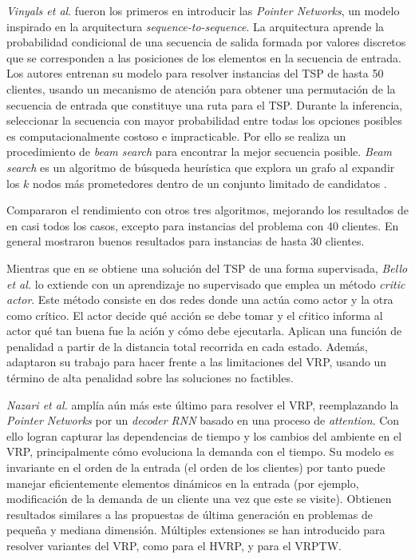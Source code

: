 \textit{Vinyals et al}. \cite{PointerNVinyals} fueron los primeros en introducir las \textit{Pointer Networks}, un modelo inspirado en la arquitectura \textit{sequence-to-sequence}. 
 La arquitectura aprende la probabilidad condicional de una secuencia de salida formada por valores discretos que se corresponden a las posiciones de los elementos en la secuencia de entrada. Los autores entrenan su modelo para resolver instancias del TSP de hasta 50 clientes, usando un mecanismo de atención para obtener una permutación de la secuencia de entrada que constituye una ruta para el TSP. Durante la inferencia, seleccionar la secuencia con mayor probabilidad entre todas los opciones posibles es computacionalmente costoso e impracticable. Por ello se realiza un procedimiento de \textit{beam search} para encontrar la mejor secuencia posible. \textit{Beam search } es un algoritmo de búsqueda heurística que explora un grafo al expandir los $k$ nodos más prometedores dentro de un conjunto limitado de candidatos \cite{PeterNorvig}.
 
 Compararon el rendimiento con otros tres algoritmos, mejorando los resultados de \cite{SubOptTSPSolver} en casi todos los casos, excepto para instancias del problema con 40 clientes. En general mostraron buenos resultados para instancias de hasta 30 clientes.

Mientras que en \cite{PointerNVinyals} se obtiene una solución del TSP de una forma supervisada, \textit{Bello et al.} \cite{BelloNCORL} lo extiende con un aprendizaje no supervisado que emplea un método \textit{critic actor}. Este  método consiste en dos redes donde una actúa como actor y la otra como crítico. El actor decide qué acción se debe tomar y el cŕitico informa al actor qué tan buena fue la ación y cómo debe ejecutarla. 
Aplican una función de penalidad a partir de la distancia total recorrida en cada estado. Además, adaptaron su trabajo para hacer frente a las limitaciones del VRP, usando un término de alta penalidad sobre las soluciones no factibles. 

 \textit{Nazari et al.}\cite{NazariRL} amplía aún más este último para resolver el VRP, reemplazando la \textit{Pointer Networks} por un \textit{decoder RNN} basado en una proceso de \textit{attention}. Con ello logran capturar las dependencias de tiempo y los cambios del ambiente en el VRP, principalmente cómo evoluciona la demanda con el tiempo. Su modelo es invariante en el orden de la entrada (el orden de los clientes) por tanto puede manejar eficientemente elementos dinámicos en la entrada (por ejemplo, modificación de la demanda de un cliente una vez que este se visite). Obtienen resultados similares a las propuestas de última generación en problemas de pequeña y mediana dimensión. Múltiples extensiones se han introducido para resolver variantes del VRP, como \cite{VeraHVRP, ChenHVRP} para el HVRP, y \cite{ZhangWVRP} para el VRPTW. 

